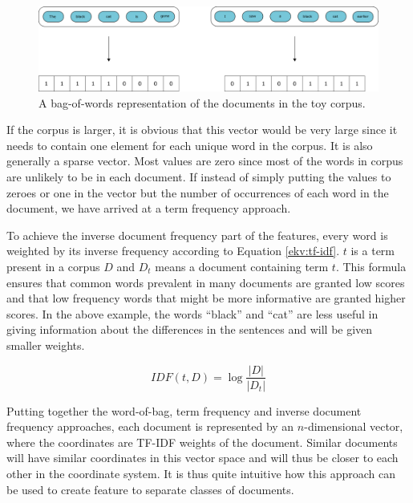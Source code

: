 \documentclass[nofilelist]{cslthse-msc}
\begin{document}
\begin{figure}[ht]
    \centering
    \includegraphics[width=\textwidth]{bag-of-words.pdf}
    \caption{A bag-of-words representation of the documents in the toy corpus.}
    \label{fig:bag-of-words}
\end{figure}



If the corpus is larger, it is obvious that this vector would be very large since it needs to contain one element for each unique word in the corpus. It is also generally a sparse vector. Most values are zero since most of the words in corpus are unlikely to be in each document. If instead of simply putting the values to zeroes or one in the vector but the number of occurrences of each word in the document, we have arrived at a term frequency approach.

 To achieve the inverse document frequency part of the features, every word is weighted by its inverse frequency according to Equation \ref{ekv:tf-idf}. $t$ is a term present in a corpus $D$ and $D_t$ means a document containing  term $t$. This formula ensures that common words prevalent in many documents are granted low scores and that low frequency words that might be more informative are granted higher scores. In the above example, the words ``black'' and ``cat'' are less useful in giving information about the differences in the sentences and will be given smaller weights.

\begin{equation}
    IDF(t, D) = \log{\frac{|D|}{|D_t|}}
    \label{ekv:tf-idf}
\end{equation}

Putting together the word-of-bag, term frequency and inverse document frequency approaches, each document is represented by an $n$-dimensional vector, where the coordinates are TF-IDF weights of the document. Similar documents will have similar coordinates in this vector space and will thus be closer to each other in the coordinate system. It is thus quite intuitive how this approach can be used to create feature to separate classes of documents.
\end{document}

